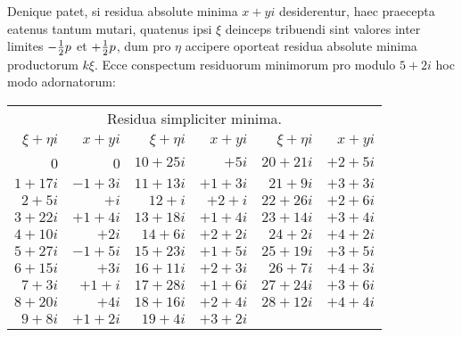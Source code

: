 \documentclass[twoside,12pt]{memoir}
\let\oldfrac\frac
\def\frac#1#2{\mathchoice{\tfrac{#1}{#2}}{\oldfrac{#1}{#2}}{\genfrac{}{}{}{2}{#1}{#2\mathstrut}}{\genfrac{}{}{}{3}{#1}{#2\mathstrut}}}
\begin{document}
Denique patet, si residua absolute minima \(x+y i\) desiderentur, haec praecepta eatenus tantum mutari, quatenus ipsi \(\xi\) deinceps tribuendi sint valores inter limites \(-\frac{1}{2} p\) et \(+\frac{1}{2} p\), dum pro \(\eta\) accipere oporteat residua absolute minima productorum \(k \xi\). Ecce conspectum residuorum minimorum pro modulo \(5+2 i\) hoc modo adornatorum:
\begin{center}
\begin{tabular}{r|r||r|r||r|r}
\multicolumn{6}{c}{Residua simpliciter minima.}\\
\(\xi+\eta i\) & \(x+y i\) & \(\xi+\eta i\) & \(x+y i\) & \(\xi+\eta i\) & \(x+y i\) \\
\hline
0 & 0 & \(10+25 i\) & \(+5 i\) & \(20+21 i\) & \(+2+5 i\) \\
\(1+17 i\) & \(-1+3 i\) & \(11+13 i\) & \(+1+3 i\) & \(21+9 i\) & \(+3+3 i\) \\
\(2+5 i\) & \(+i\) & \(12+i\) & \(+2+i\) & \(22+26 i\) & \(+2+6 i\) \\
\(3+22 i\) & \(+1+4 i\) & \(13+18 i\) & \(+1+4 i\) & \(23+14 i\) & \(+3+4 i\) \\
\(4+10 i\) & \(+2 i\) & \(14+6 i\) & \(+2+2 i\) & \(24+2 i\) & \(+4+2 i\) \\
\(5+27 i\) & \(-1+5 i\) & \(15+23 i\) & \(+1+5 i\) & \(25+19 i\) & \(+3+5 i\) \\
\(6+15 i\) & \(+3 i\) & \(16+11 i\) & \(+2+3 i\) & \(26+7 i\) & \(+4+3 i\) \\
\(7+3 i\) & \(+1+i\) & \(17+28 i\) & \(+1+6 i\) & \(27+24 i\) & \(+3+6 i\) \\
\(8+20 i\) & \(+4 i\) & \(18+16 i\) & \(+2+4 i\) & \(28+12 i\) & \(+4+4 i\) \\
\(9+8 i\) & \(+1+2 i\) & \(19+4 i\) & \(+3+2 i\) &\multicolumn{2}{c}{}  \\
\end{tabular}\pagebreak%


\end{center}
\end{document}
